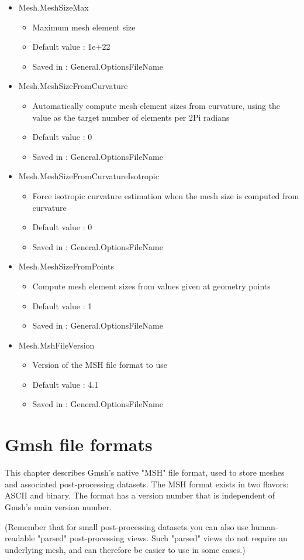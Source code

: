 \documentclass[dvipdfmx, 9pt, a4paper]{article}
\numberwithin{equation}{section}
\begin{document}
\begin{itemize}
\begin{itemize}
\end{itemize}
\item Mesh.MeshSizeMax
\begin{itemize}
\item Maximum mesh element size
\item Default value : 1e+22
\item Saved in : General.OptionsFileName
\end{itemize}
\item Mesh.MeshSizeFromCurvature
\begin{itemize}
\item Automatically compute mesh element sizes from curvature, using the value as the target number of elements per 2Pi radians
\item Default value : 0
\item Saved in : General.OptionsFileName
\end{itemize}
\item Mesh.MeshSizeFromCurvatureIsotropic
\begin{itemize}
\item Force isotropic curvature estimation when the mesh size is computed from curvature
\item Default value : 0
\item Saved in : General.OptionsFileName
\end{itemize}
\item Mesh.MeshSizeFromPoints
\begin{itemize}
\item Compute mesh element sizes from values given at geometry points
\item Default value : 1
\item Saved in : General.OptionsFileName
\end{itemize}
\item Mesh.MshFileVersion
\begin{itemize}
\item Version of the MSH file format to use
\item Default value : 4.1
\item Saved in : General.OptionsFileName
\end{itemize}
\end{itemize}

\section{Gmsh file formats}
This chapter describes Gmsh’s native "MSH" file format, used to store meshes and associated post-processing datasets. The MSH format exists in two flavors: ASCII and binary. The format has a version number that is independent of Gmsh's main version number.\par
(Remember that for small post-processing datasets you can also use human-readable "parsed" post-processing views. Such "parsed" views do not require an underlying mesh, and can therefore be easier to use in some cases.)
\end{document}
